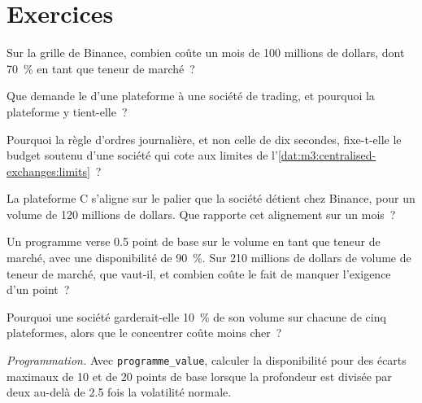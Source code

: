 \section{Exercices}

\begin{exercise}[$\star$]\label{exo:m3:getting-access-crypto-venues:1}
Sur la grille de Binance, combien coûte un mois de 100 millions de dollars, dont 70~\% en tant que teneur de marché~?
\end{exercise}

\begin{exercise}[$\star$]\label{exo:m3:getting-access-crypto-venues:2}
Que demande le  d'une plateforme à une société de trading, et pourquoi la plateforme y tient-elle~?
\end{exercise}

\begin{exercise}[$\star$]\label{exo:m3:getting-access-crypto-venues:3}
Pourquoi la règle d'ordres journalière, et non celle de dix secondes, fixe-t-elle le budget soutenu d'une société qui cote aux limites de
l'\cref{dat:m3:centralised-exchanges:limits}~?
\end{exercise}

\begin{exercise}[$\star\star$]\label{exo:m3:getting-access-crypto-venues:4}
La plateforme C s'aligne sur le palier que la société détient chez Binance, pour un volume de 120 millions de dollars. Que rapporte cet alignement sur un mois~?
\end{exercise}

\begin{exercise}[$\star\star$]\label{exo:m3:getting-access-crypto-venues:5}
Un programme verse 0.5 point de base sur le volume en tant que teneur de marché, avec une disponibilité de 90~\%. Sur 210 millions de dollars de volume de teneur de marché, que vaut-il, et combien coûte
le fait de manquer l'exigence d'un point~?
\end{exercise}

\begin{exercise}[$\star\star$]\label{exo:m3:getting-access-crypto-venues:6}
Pourquoi une société garderait-elle 10~\% de son volume sur chacune de cinq plateformes, alors que le concentrer coûte moins cher~?
\end{exercise}

\begin{exercise}[$\star\star\star$]\label{exo:m3:getting-access-crypto-venues:7}
\emph{Programmation.} Avec \texttt{programme\_value}, calculer la disponibilité pour des écarts maximaux de 10 et de 20 points de base lorsque la profondeur est divisée par deux au-delà de 2.5 fois la
volatilité normale.
\end{exercise}

